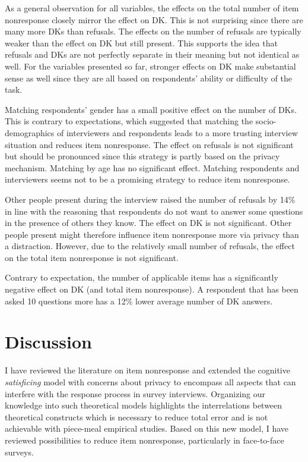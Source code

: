 \documentclass[a4paper,12pt]{article}
\begin{document}
As a general observation for all variables, the effects on the total number of item nonresponse closely mirror the effect on DK. This is not surprising since there are many more DKs than refusals. The effects on the number of refusals are typically weaker than the effect on DK but still present. This supports the idea that refusals and DKs are not perfectly separate in their meaning but not identical as well. For the variables presented so far, stronger effects on DK make substantial sense as well since they are all based on respondents' ability or difficulty of the task.

Matching respondents' gender has a small positive effect on the number of DKs. This is contrary to expectations, which suggested that matching the socio-demographics of interviewers and respondents leads to a more trusting interview situation and reduces item nonresponse. The effect on refusals is not significant but should be pronounced since this strategy is partly based on the privacy mechanism. Matching by age has no significant effect. Matching respondents and interviewers seems not to be a promising strategy to reduce item nonresponse.

Other people present during the interview raised the number of refusals by 14\% in line with the reasoning that respondents do not want to answer some questions in the presence of others they know. The effect on DK is not significant. Other people present might therefore influence item nonresponse more via privacy than a distraction. However, due to the relatively small number of refusals, the effect on the total item nonresponse is not significant.

Contrary to expectation, the number of applicable items has a significantly negative effect on DK (and total item nonresponse). A respondent that has been asked 10 questions more has a 12\% lower average number of DK answers.


\section{Discussion}

I have reviewed the literature on item nonresponse and extended the cognitive \textit{satisficing} model \citep{krosnickResponseStrategiesCoping1991} with concerns about privacy to encompass all aspects that can interfere with the response process in survey interviews. Organizing our knowledge into such theoretical models highlights the interrelations between theoretical constructs which is necessary to reduce total error and is not achievable with piece-meal empirical studies. Based on this new model, I have reviewed possibilities to reduce item nonresponse, particularly in face-to-face surveys.
\end{document}
